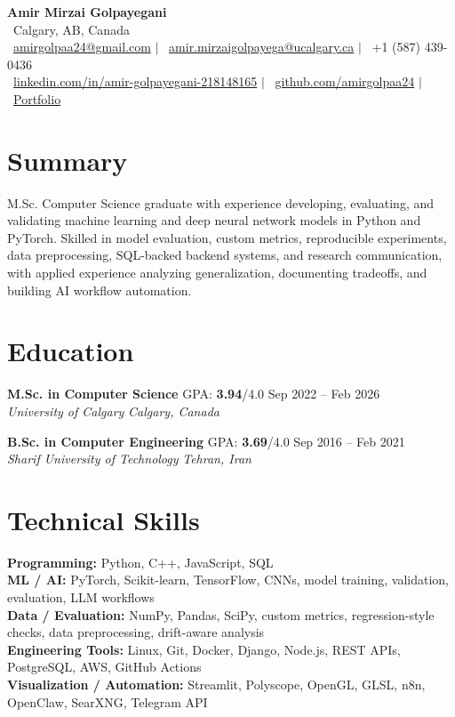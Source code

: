 \documentclass[a4paper,10pt]{article}
\newcommand{\resumeEducationSubheading}[5]{
    \textbf{#1} \hfill #2 \hfill #3 \\
    \textit{#4} \hfill \textit{#5}
}
\begin{document}
\begin{center}
    {\LARGE \textbf{Amir Mirzai Golpayegani}} \\[0.25em]
    \faMapMarker*~Calgary, AB, Canada \\[0.25em]
    \faEnvelope~\href{mailto:amirgolpaa24@gmail.com}{amirgolpaa24@gmail.com}
    $|$
    \faEnvelope~\href{mailto:amir.mirzaigolpayega@ucalgary.ca}{amir.mirzaigolpayega@ucalgary.ca}
    $|$
    \faPhone*~+1 (587) 439-0436 \\[0.25em]
    \faLinkedin~\href{https://linkedin.com/in/amir-golpayegani-218148165}{linkedin.com/in/amir-golpayegani-218148165}
    $|$
    \faGithub~\href{https://github.com/amirgolpaa24}{github.com/amirgolpaa24}
    $|$
    \faGlobe~\href{https://amir-portfolio-navy.vercel.app/}{Portfolio}
\end{center}

\section*{Summary}

M.Sc. Computer Science graduate with experience developing, evaluating, and validating machine learning and deep neural network models in Python and PyTorch. Skilled in model evaluation, custom metrics, reproducible experiments, data preprocessing, SQL-backed backend systems, and research communication, with applied experience analyzing generalization, documenting tradeoffs, and building AI workflow automation.

\section*{Education}

\resumeEducationSubheading
{M.Sc. in Computer Science}
{GPA: \textbf{3.94}/4.0}
{Sep 2022 -- Feb 2026}
{University of Calgary}
{Calgary, Canada}

\vspace{0.35em}

\resumeEducationSubheading
{B.Sc. in Computer Engineering}
{GPA: \textbf{3.69}/4.0}
{Sep 2016 -- Feb 2021}
{Sharif University of Technology}
{Tehran, Iran}

\section*{Technical Skills}

\textbf{Programming:} Python, C++, JavaScript, SQL \\
\textbf{ML / AI:} PyTorch, Scikit-learn, TensorFlow, CNNs, model training, validation, evaluation, LLM workflows \\
\textbf{Data / Evaluation:} NumPy, Pandas, SciPy, custom metrics, regression-style checks, data preprocessing, drift-aware analysis \\
\textbf{Engineering Tools:} Linux, Git, Docker, Django, Node.js, REST APIs, PostgreSQL, AWS, GitHub Actions \\
\textbf{Visualization / Automation:} Streamlit, Polyscope, OpenGL, GLSL, n8n, OpenClaw, SearXNG, Telegram API
\end{document}
